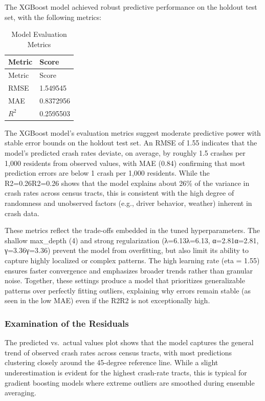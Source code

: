 \documentclass[
  number,
  review,
  3p]{elsarticle}
\begin{document}
The XGBoost model achieved robust predictive performance on the holdout
test set, with the following metrics:\\

\begin{longtable}[]{@{}ll@{}}
\caption{Model Evaluation Metrics}\tabularnewline
\toprule\noalign{}
Metric & Score \\
\midrule\noalign{}
\endfirsthead
\toprule\noalign{}
Metric & Score \\
\midrule\noalign{}
\endhead
\bottomrule\noalign{}
\endlastfoot
RMSE & 1.549545 \\
MAE & 0.8372956 \\
\(R^2\) & 0.2595503 \\
\end{longtable}

The XGBoost model's evaluation metrics suggest moderate predictive power
with stable error bounds on the holdout test set. An RMSE of 1.55
indicates that the model's predicted crash rates deviate, on average, by
roughly 1.5 crashes per 1,000 residents from observed values, with MAE
(0.84) confirming that most prediction errors are below 1 crash per
1,000 residents. While the R2=0.26R2=0.26 shows that the model explains
about 26\% of the variance in crash rates across census tracts, this is
consistent with the high degree of randomness and unobserved factors
(e.g., driver behavior, weather) inherent in crash data.

These metrics reflect the trade-offs embedded in the tuned
hyperparameters. The shallow max\_depth (4) and strong regularization
(λ=6.13λ=6.13, α=2.81α=2.81, γ=3.36γ=3.36) prevent the model from
overfitting, but also limit its ability to capture highly localized or
complex patterns. The high learning rate (eta = 1.55) ensures faster
convergence and emphasizes broader trends rather than granular noise.
Together, these settings produce a model that prioritizes generalizable
patterns over perfectly fitting outliers, explaining why errors remain
stable (as seen in the low MAE) even if the R2R2 is not exceptionally
high.

\subsubsection{\texorpdfstring{\textbf{Examination of the
Residuals}}{Examination of the Residuals}}\label{examination-of-the-residuals}

The predicted vs.~actual values plot shows that the model captures the
general trend of observed crash rates across census tracts, with most
predictions clustering closely around the 45-degree reference line.
While a slight underestimation is evident for the highest crash-rate
tracts, this is typical for gradient boosting models where extreme
outliers are smoothed during ensemble averaging.
\end{document}
